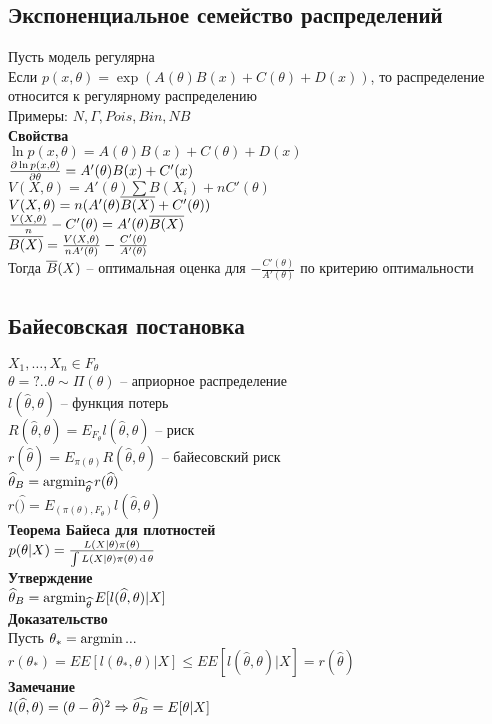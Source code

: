 \documentclass[12pt]{article}
\begin{document}
\subsection{Экспоненциальное семейство распределений}
Пусть модель регулярна\\
Если $p(x, \theta) = \exp(A(\theta)B(x) + C(\theta) + D(x))$, то распределение относится к регулярному распределению\\
Примеры: $N, \Gamma, Pois, Bin, NB$\\
\textbf{Свойства}\\
$\ln p(x, \theta) = A(\theta)B(x) + C(\theta) + D(x)$\\
$\frac{\partial \ln p(x, \theta)}{\partial \theta} = A'(\theta) B(x) + C'(x)$\\
$V(X, \theta) = A'(\theta)\sum B(X_i) + nC'(\theta)$\\
$V(X, \theta) = n(A'(\theta) \overline{B(X)} + C'(\theta))$\\
$\frac{V(X, \theta)}{n} - C'(\theta) = A'(\theta) \overline{B(X)}$\\
$\overline{B(X)} = \frac{V(X, \theta)}{n A'(\theta)} - \frac{C'(\theta)}{A'(\theta)}$\\
Тогда $\overline B(X)$ -- оптимальная оценка для $- \frac{C'(\theta)}{A'(\theta)}$ по критерию оптимальности
\subsection{Байесовская постановка}
$X_1, \ldots, X_n \in F_\theta$\\
$\theta = ?.. \theta \sim \Pi(\theta)$ -- априорное распределение\\
$l(\widehat \theta, \theta)$ -- функция потерь\\
$R(\widehat \theta, \theta) = E_{F_\theta}l(\widehat \theta, \theta)$ -- риск\\
$r(\widehat \theta) = E_{\pi(\theta)} R(\widehat \theta, \theta)$ -- байесовский риск\\
$\widehat \theta_B = \operatorname{argmin}_{\widehat \theta} r(\widehat \theta)$\\
$r(\widehat) = E_{(\pi(\theta), F_\theta)}l(\widehat \theta, \theta)$\\
\textbf{Теорема Байеса для плотностей}\\
$p(\theta|X) = \frac{L(X|\theta)\pi(\theta)}{\int L(X|\theta)\pi(\theta) \operatorname{d} \theta}$\\
\textbf{Утверждение}\\
$\widehat \theta_B = \operatorname{argmin}_{\widehat \theta} E[l(\widehat{\theta}, \theta)| X]$\\
\textbf{Доказательство}\\
Пусть $\theta_* = \operatorname{argmin} ...$\\
$r(\theta_*) = EE[l(\theta_*, \theta)|X] \leq EE[l(\widehat \theta, \theta)|X] = r(\widehat \theta)$\\
\textbf{Замечание}\\
$l(\widehat \theta, \theta) = (\theta - \widehat \theta)^2 \Rightarrow \widehat{\theta_B} = E[\theta|X]$\\
\end{document}
